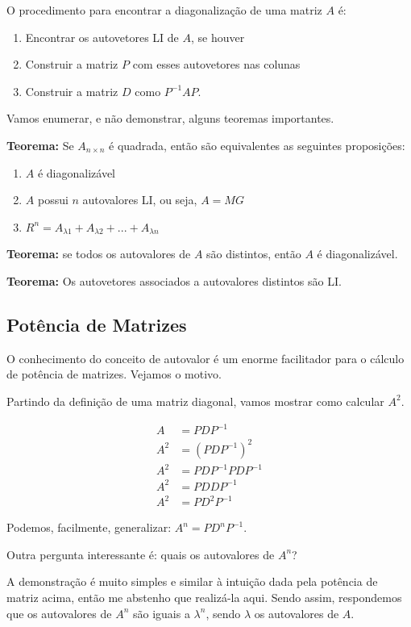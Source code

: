 \documentclass[12pt]{article}
\begin{document}
	O procedimento para encontrar a diagonalização de uma matriz $A$ é:
	\begin{enumerate}
		\item Encontrar os autovetores LI de $A$, se houver
		\item Construir a matriz $P$ com esses autovetores nas colunas
		\item Construir a matriz $D$ como $P^{-1}AP$.
	\end{enumerate}
	
	Vamos enumerar, e não demonstrar, alguns teoremas importantes. 
	
	\textbf{Teorema:} Se $A_{n\times n}$ é quadrada, então são equivalentes as seguintes proposições:
	\begin{enumerate}
		\item $A$ é diagonalizável
		\item $A$ possui $n$ autovalores LI, ou seja, $A=MG$
		\item $R^n=A_{\lambda1}+A_{\lambda2}+...+A_{\lambda n}$ 
	\end{enumerate}
	
	\textbf{Teorema:} se todos os autovalores de $A$ são distintos, então $A$ é diagonalizável.
	
	\textbf{Teorema:} Os autovetores associados a autovalores distintos são LI.
	
	\subsection{Potência de Matrizes}
	
	O conhecimento do conceito de autovalor é um enorme facilitador para o cálculo de potência de matrizes. Vejamos o motivo.
	
	Partindo da definição de uma matriz diagonal, vamos mostrar como calcular $A^2$.
	
	\begin{align*}
		A&=PDP^{-1}\\
		A^2&=(PDP^{-1})^2\\
		A^2&=PDP^{-1}PDP^{-1}\\
		A^2&=PDDP^{-1}\\
		A^2&=PD^2P^{-1}
	\end{align*}
	
	Podemos, facilmente, generalizar: $A^n=PD^nP^{-1}$.
	
	Outra pergunta interessante é: quais os autovalores de $A^n$?
	
	A demonstração é muito simples e similar à intuição dada pela potência de matriz acima, então me abstenho que realizá-la aqui. Sendo assim, respondemos que os autovalores de $A^n$ são iguais a $\lambda^n$, sendo $\lambda$ os autovalores de $A$. 
	
\end{document}
